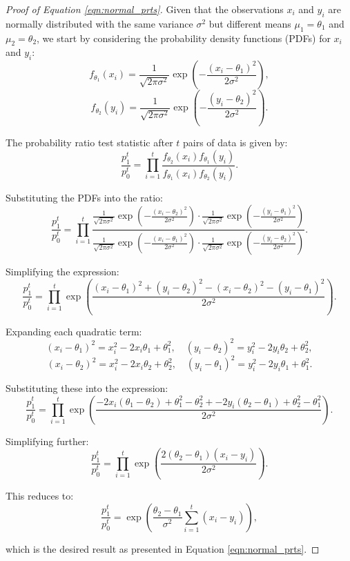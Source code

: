 \documentclass[magisterska, english]{pwr_wmat_praca_dyplomowa}
\theoremstyle{plain}
\numberwithin{theorem}{chapter}
\theoremstyle{definition}
\numberwithin{theorem}{chapter}
\begin{document}
\begin{proof}[Proof of Equation \eqref{eqn:normal_prts}]
	
	Given that the observations \(x_i\) and \(y_i\) are normally distributed with the same variance \(\sigma^2\) but different means \(\mu_1 = \theta_1\) and \(\mu_2 = \theta_2\), we start by considering the probability density functions (PDFs) for \(x_i\) and \(y_i\):
	\[
	f_{\theta_1}(x_i) = \frac{1}{\sqrt{2\pi\sigma^2}} \exp\left(-\frac{(x_i - \theta_1)^2}{2\sigma^2}\right),
	\]
	\[
	f_{\theta_2}(y_i) = \frac{1}{\sqrt{2\pi\sigma^2}} \exp\left(-\frac{(y_i - \theta_2)^2}{2\sigma^2}\right).
	\]
	
	The probability ratio test statistic after \(t\) pairs of data is given by:
	\[
	\frac{p_1^t}{p_0^t} = \prod_{i=1}^{t} \frac{f_{\theta_2}(x_i) f_{\theta_1}(y_i)}{f_{\theta_1}(x_i) f_{\theta_2}(y_i)}.
	\]
	
	Substituting the PDFs into the ratio:
	\[
	\frac{p_1^t}{p_0^t} = \prod_{i=1}^{t} \frac{\frac{1}{\sqrt{2\pi\sigma^2}} \exp\left(-\frac{(x_i - \theta_2)^2}{2\sigma^2}\right) \cdot \frac{1}{\sqrt{2\pi\sigma^2}} \exp\left(-\frac{(y_i - \theta_1)^2}{2\sigma^2}\right)}{\frac{1}{\sqrt{2\pi\sigma^2}} \exp\left(-\frac{(x_i - \theta_1)^2}{2\sigma^2}\right) \cdot \frac{1}{\sqrt{2\pi\sigma^2}} \exp\left(-\frac{(y_i - \theta_2)^2}{2\sigma^2}\right)}.
	\]
	
	Simplifying the expression:
	\[
	\frac{p_1^t}{p_0^t} = \prod_{i=1}^{t} \exp\left(\frac{(x_i - \theta_1)^2 + (y_i - \theta_2)^2 - (x_i - \theta_2)^2 - (y_i - \theta_1)^2}{2\sigma^2}\right).
	\]
	
	Expanding each quadratic term:
	\[
	(x_i - \theta_1)^2 = x_i^2 - 2x_i\theta_1 + \theta_1^2, \quad
	(y_i - \theta_2)^2 = y_i^2 - 2y_i\theta_2 + \theta_2^2,
	\]
	\[
	(x_i - \theta_2)^2 = x_i^2 - 2x_i\theta_2 + \theta_2^2,\quad
	(y_i - \theta_1)^2 = y_i^2 - 2y_i\theta_1 + \theta_1^2.
	\]
	
	Substituting these into the expression:
	\[
	\frac{p_1^t}{p_0^t} = \prod_{i=1}^{t} \exp\left(\frac{-2x_i(\theta_1 - \theta_2) + \theta_1^2 - \theta_2^2 + -2y_i(\theta_2 - \theta_1) + \theta_2^2 - \theta_1^2}{2\sigma^2}\right).
	\]
	
	Simplifying further:
	\[
	\frac{p_1^t}{p_0^t} = \prod_{i=1}^{t} \exp\left(\frac{2(\theta_2 - \theta_1)(x_i - y_i)}{2\sigma^2}\right).
	\]
	
	This reduces to:
	\[
	\frac{p_1^t}{p_0^t} = \exp\left(\frac{\theta_2 - \theta_1}{\sigma^2} \sum_{i=1}^{t} (x_i - y_i)\right),
	\]
	
	which is the desired result as presented in Equation \eqref{eqn:normal_prts}.
\end{proof}
\end{document}
